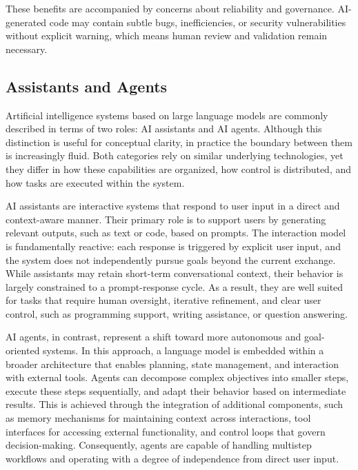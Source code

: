 These benefits are accompanied by concerns about reliability and governance. AI-generated code may contain subtle bugs, inefficiencies, or security vulnerabilities without explicit warning, which means human review and validation remain necessary. \cite{pearce2025asleep}

\newpage
\subsection{Assistants and Agents}
Artificial intelligence systems based on large language models are commonly described in terms of two roles: AI assistants and AI agents. \cite{IBM2026AIAgentsVsAIAssistants} Although this distinction is useful for conceptual clarity, in practice the boundary between them is increasingly fluid. \cite{yao2022react} Both categories rely on similar underlying technologies, yet they differ in how these capabilities are organized, how control is distributed, and how tasks are executed within the system.

AI assistants are interactive systems that respond to user input in a direct and context-aware manner. Their primary role is to support users by generating relevant outputs, such as text or code, based on prompts. The interaction model is fundamentally reactive: each response is triggered by explicit user input, and the system does not independently pursue goals beyond the current exchange. While assistants may retain short-term conversational context, their behavior is largely constrained to a prompt-response cycle. As a result, they are well suited for tasks that require human oversight, iterative refinement, and clear user control, such as programming support, writing assistance, or question answering.

AI agents, in contrast, represent a shift toward more autonomous and goal-oriented systems. In this approach, a language model is embedded within a broader architecture that enables planning, state management, and interaction with external tools. Agents can decompose complex objectives into smaller steps, execute these steps sequentially, and adapt their behavior based on intermediate results. This is achieved through the integration of additional components, such as memory mechanisms for maintaining context across interactions, tool interfaces for accessing external functionality, and control loops that govern decision-making. Consequently, agents are capable of handling multistep workflows and operating with a degree of independence from direct user input.

